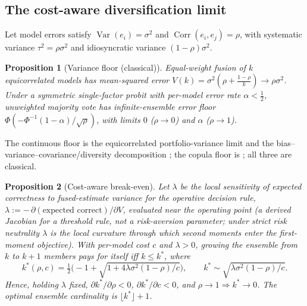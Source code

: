 \documentclass[11pt]{article}
\theoremstyle{plain}
\newtheorem{proposition}{Proposition}
\theoremstyle{definition}
\newcommand{\Var}{\operatorname{Var}}
\newcommand{\Corr}{\operatorname{Corr}}
\begin{document}
\subsection{The cost-aware diversification limit}\label{sec:B}
Let model errors satisfy $\Var(e_i)=\sigma^2$ and $\Corr(e_i,e_j)=\rho$, with systematic variance $\tau^2=\rho\sigma^2$
and idiosyncratic variance $(1-\rho)\sigma^2$.

\begin{proposition}[Variance floor (classical)]\label{prop:floor}
Equal-weight fusion of $k$ equicorrelated models has mean-squared error $V(k)=\sigma^2(\rho+\tfrac{1-\rho}{k})\to\rho\sigma^2$.
Under a symmetric single-factor probit with per-model error rate $\alpha<\tfrac12$, unweighted majority vote has infinite-ensemble
error floor $\Phi(-\Phi^{-1}(1-\alpha)/\sqrt\rho)$, with limits $0$ ($\rho\to0$) and $\alpha$ ($\rho\to1$).
\end{proposition}
\noindent The continuous floor is the equicorrelated portfolio-variance limit \citep{markowitz1952,statman1987} and the
bias--variance--covariance/diversity decomposition \citep{ueda1996,krogh1995ensemble,wood2023diversity}; the copula floor is
\citet{turkmen2026ensembleselection}; all three are classical.

\begin{proposition}[Cost-aware break-even]\label{prop:keven}
Let $\lambda$ be the local sensitivity of expected correctness to fused-estimate variance for the operative decision rule,
$\lambda := -\,\partial(\text{expected correct})/\partial V$, evaluated near the operating point (a derived Jacobian for a
threshold rule, not a risk-aversion parameter; under strict risk neutrality $\lambda$ is the local curvature through which
second moments enter the first-moment objective). With per-model cost $c$ and $\lambda>0$, growing the ensemble from $k$ to
$k{+}1$ members pays for itself iff $k\le k^\ast$, where
\begin{equation}
k^\ast(\rho,c)=\tfrac12\Big(-1+\sqrt{1+4\lambda\sigma^2(1-\rho)/c}\Big),\qquad
k^\ast\sim\sqrt{\lambda\sigma^2(1-\rho)/c}.\label{eq:keven}
\end{equation}
Hence, holding $\lambda$ fixed, $\partial k^\ast/\partial\rho<0$, $\partial k^\ast/\partial c<0$, and $\rho\to1\Rightarrow k^\ast\to0$. The optimal
ensemble cardinality is $\lfloor k^\ast\rfloor{+}1$.
\end{proposition}
\end{document}
